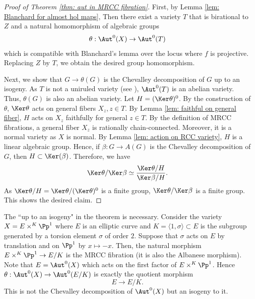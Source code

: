 \documentclass[11pt]{amsart}
\begin{document}
\begin{proof}[Proof of Theorem \ref{thm: aut in MRCC fibration}]
First, by Lemma \ref{lem: Blanchard for almost hol maps}, Then there exist a variety $T$ that is birational to $Z$ and a natural homomorphism of algebraic groups
    \[
    \theta: \Aut^0(X) \to \Aut^0(T)
    \] which is compatible with Blanchard's lemma over the locus where $f$ is projective. Replacing $Z$ by $T$, we obtain the desired group homomorphism. 

Next, we show that $G \to \theta(G)$ is the Chevalley decomposition of $G$ up to an isogeny. As $T$ is not a uniruled variety (see \cite[Corollary 1.4]{GHS03}), $\Aut^0(T)$ is an abelian variety. Thus, $\theta(G)$ is also an abelian variety. Let $H = (\Ker \theta)^0$. By the construction of $\theta$, $\Ker \theta$ acts on general fibers $X_z, z\in T$. By Lemma \ref{lem: faithful on general fiber}, $H$ acts on $X_z$ faithfully for general $z\in T$. By the definition of MRCC fibrations, a general fiber $X_z$ is rationally chain-connected. Moreover, it is a normal variety as $X$ is normal. By Lemma \ref{lem: action on RCC variety}, $H$ is a linear algebraic group. Hence, if $\beta: G \to A(G)$ is the Chevalley decomposition of $G$, then $H \subset \Ker(\beta)$. Therefore, we have
\[
\Ker \theta/ \Ker \beta \simeq  \frac{\Ker \theta/ H}{\Ker \beta/ H}.
\] As $\Ker \theta/ H=\Ker \theta/ (\Ker \theta)^0$ is a finite group, $\Ker \theta/ \Ker \beta$ is a finite group. This shows the desired claim.
\end{proof}


\begin{remark}
The ``up to an isogeny" in the theorem is necessary. Consider the variety $X = E \times^K \Pp^1$ where $E$ is an elliptic curve and $K=\langle 1, \sigma \rangle\subset E$ is the subgroup generated by a torsion element $\sigma$ of order $2$. Suppose that $\sigma$ acts on $E$ by translation and on $\Pp^1$ by $x \mapsto -x$. Then, the natural morphism $E \times^K \Pp^1 \to E/K$ is the MRCC fibration (it is also the Albanese morphism). Note that $E = \Aut^0(X)$ which acts on the first factor of $E \times^K \Pp^1$. Hence $\theta: \Aut^0(X) \to \Aut^0(E/K)$ is exactly the quotient morphism 
\[
E \to E/K.
\] This is not the Chevalley decomposition of $\Aut^0(X)$ but an isogeny to it.
\end{remark}
\end{document}
